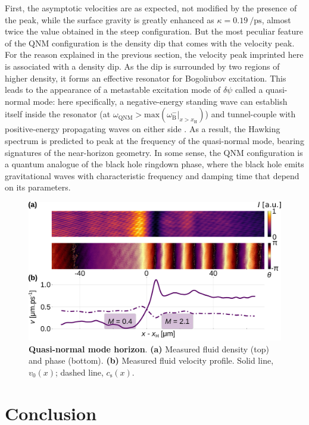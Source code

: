 First, the asymptotic velocities are as expected, not modified by the presence of the peak, while the surface gravity 
is greatly enhanced as $\kappa = \SI{0.19}{\per \pico \second}$, almost twice the value obtained in the steep configuration.
But the most peculiar feature of the QNM configuration is the density dip that comes with the velocity peak. For the reason explained in the previous section,
the velocity peak imprinted here is associated with a density dip. As the dip is surrounded by two regions of higher density, it forms an effective resonator for Bogoliubov excitation.
This leads to the appearance of a metastable excitation mode of $\delta \psi$ called a quasi-normal mode: here specifically, a negative-energy standing wave can establish itself inside the resonator (at $\omega_\mathrm{QNM}>\mathrm{max}(\omega_\mathrm{B}^-|_{x>x_\mathrm{H}})$) and tunnel-couple with positive-energy propagating waves on either side \cite{jacquet_quantum_2023}.
As a result, the Hawking spectrum is predicted to peak at the frequency of the quasi-normal mode, bearing signatures of the near-horizon geometry. 
In some sense, the QNM configuration is a quantum analogue of the black hole ringdown phase, where the black hole emits gravitational waves with characteristic frequency and damping time \cite{brito_superradiance_2015} that depend on its parameters. 

\begin{figure}[h]
    \centering
    \includegraphics[width=1\textwidth]{chap_custom_st/fig/bh_qnm.pdf}
    \caption{\textbf{Quasi-normal mode horizon}.    
    \textbf{(a)} Measured fluid density (top) and phase (bottom).
    \textbf{(b)} Measured fluid velocity profile.
    Solid line, $v_0(x)$; dashed line, $c_\mathrm{s}(x)$.}
    \label{fig:bh_qnm}
\end{figure}
\clearpage
\section{Conclusion}


